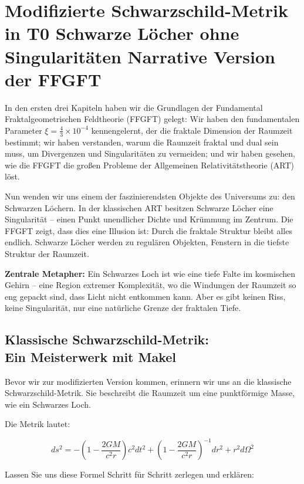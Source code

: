 \chapter{Modifizierte Schwarzschild-Metrik in T0  Schwarze Löcher ohne Singularitäten  Narrative Version der FFGFT}


	
	In den ersten drei Kapiteln haben wir die Grundlagen der Fundamental Fraktalgeometrischen Feldtheorie (FFGFT) gelegt: Wir haben den fundamentalen Parameter \(\xi = \frac{4}{3} \times 10^{-4}\) kennengelernt, der die fraktale Dimension der Raumzeit bestimmt; wir haben verstanden, warum die Raumzeit fraktal und dual sein muss, um Divergenzen und Singularitäten zu vermeiden; und wir haben gesehen, wie die FFGFT die großen Probleme der Allgemeinen Relativitätstheorie (ART) löst.
	
	Nun wenden wir uns einem der faszinierendsten Objekte des Universums zu: den Schwarzen Löchern. In der klassischen ART besitzen Schwarze Löcher eine Singularität – einen Punkt unendlicher Dichte und Krümmung im Zentrum. Die FFGFT zeigt, dass dies eine Illusion ist: Durch die fraktale Struktur bleibt alles endlich. Schwarze Löcher werden zu regulären Objekten, Fenstern in die tiefste Struktur der Raumzeit.
	
	\textbf{Zentrale Metapher:} Ein Schwarzes Loch ist wie eine tiefe Falte im kosmischen Gehirn – eine Region extremer Komplexität, wo die Windungen der Raumzeit so eng gepackt sind, dass Licht nicht entkommen kann. Aber es gibt keinen Riss, keine Singularität, nur eine natürliche Grenze der fraktalen Tiefe.
	
	\section{Klassische Schwarzschild-Metrik:\\ Ein Meisterwerk mit Makel}
	
	Bevor wir zur modifizierten Version kommen, erinnern wir uns an die klassische Schwarzschild-Metrik. Sie beschreibt die Raumzeit um eine punktförmige Masse, wie ein Schwarzes Loch.
	
	Die Metrik lautet:
	
	\begin{equation}
		ds^2 = -\left(1 - \frac{2GM}{c^2 r}\right) c^2 dt^2 + \left(1 - \frac{2GM}{c^2 r}\right)^{-1} dr^2 + r^2 d\Omega^2
	\end{equation}
	
	Lassen Sie uns diese Formel Schritt für Schritt zerlegen und erklären:
	
